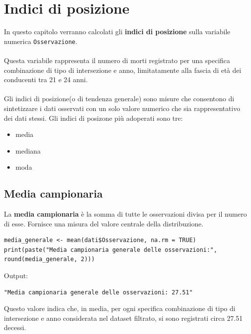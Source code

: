 \documentclass[14pt, openany, titlepage]{report} %
\begin{document}
\chapter{Indici di posizione}
In questo capitolo verranno calcolati gli \textbf{indici di posizione} 
sulla variabile numerica \texttt{Osservazione}. \\\\
\noindent
Questa variabile rappresenta il numero di morti
 registrato per una specifica combinazione di tipo di intersezione 
 e anno, limitatamente alla fascia di età dei conducenti tra 21 e 24 
 anni. \\\\
 \noindent
 Gli indici di posizione(o di tendenza generale) sono misure che consentono di 
 sintetizzare i dati osservati con un solo valore numerico che sia rappresentativo dei dati stessi.
 Gli indici di posizone più adoperati sono tre:
\begin{itemize}
  \item media
  \item mediana
  \item moda
\end{itemize}

\section{Media campionaria}
La \textbf{media campionaria} è la somma di tutte le osservazioni divisa per il numero di esse.
 Fornisce una misura del valore centrale della distribuzione.
\begin{center}
\begin{lstlisting}[breaklines=true]
media_generale <- mean(dati$Osservazione, na.rm = TRUE)
print(paste("Media campionaria generale delle osservazioni:", round(media_generale, 2)))
\end{lstlisting}  
\end{center}
\noindent
Output: 
\begin{verbatim}
"Media campionaria generale delle osservazioni: 27.51"
\end{verbatim}
Questo valore indica che, in media, per ogni specifica combinazione di tipo di intersezione e anno considerata nel dataset filtrato, si sono registrati circa 27.51 decessi.
\end{document}

